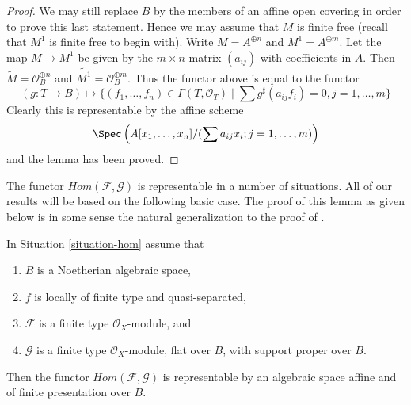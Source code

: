 \begin{proof}
\medskip\noindent
We may still replace $B$ by the members of an affine open covering
in order to prove this last statement. Hence we may assume that $M$
is finite free (recall that $M^1$ is finite free to begin with).
Write $M = A^{\oplus n}$ and $M^1 = A^{\oplus m}$. Let the map
$M \to M^1$ be given by the $m \times n$ matrix $(a_{ij})$ with
coefficients in $A$. Then $\widetilde{M} = \mathcal{O}_B^{\oplus n}$
and $\widetilde{M^1} = \mathcal{O}_B^{\oplus m}$. Thus the functor
above is equal to the functor
$$
(g : T \to B) \longmapsto
\{(f_1, \ldots, f_n) \in \Gamma(T, \mathcal{O}_T) \mid
\sum g^\sharp(a_{ij}f_i) = 0, j = 1, \ldots, m\}
$$
Clearly this is representable by the affine scheme
$$
\Spec\left(A[x_1, \ldots, x_n]/(\sum a_{ij}x_i; j = 1, \ldots, m)\right)
$$
and the lemma has been proved.
\end{proof}

\noindent
The functor $\mathit{Hom}(\mathcal{F}, \mathcal{G})$ is representable in a
number of situations. All of our results will be based on the following
basic case. The proof of this lemma as given below is in some sense the
natural generalization to the proof of \cite[III, Cor 7.7.8]{EGA}.

\begin{lemma}
\label{lemma-noetherian-hom}
In Situation \ref{situation-hom} assume that
\begin{enumerate}
\item $B$ is a Noetherian algebraic space,
\item $f$ is locally of finite type and quasi-separated,
\item $\mathcal{F}$ is a finite type $\mathcal{O}_X$-module, and
\item $\mathcal{G}$ is a finite type $\mathcal{O}_X$-module, flat over $B$,
with support proper over $B$.
\end{enumerate}
Then the functor $\mathit{Hom}(\mathcal{F}, \mathcal{G})$ is
representable by an algebraic space affine and of finite presentation
over $B$.
\end{lemma}


